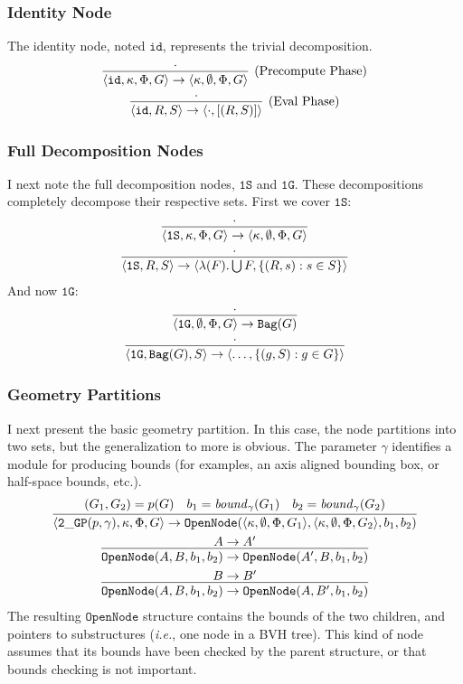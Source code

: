\documentclass{article}
\newcommand {\oneS}{\mathtt{1S}}
\newcommand {\oneG}{\mathtt{1G}}
\newcommand {\id}{\mathtt{id}}
\newcommand {\twoGP}{\mathtt{2\_GP}}
\newcommand {\bound}{\mathit{bound}}
\newcommand {\bag}{\mathtt{Bag}}
\newcommand {\twoBox}{\mathtt{OpenNode}}
\begin{document}
\subsubsection{Identity Node}
The identity node, noted $\id$, represents the trivial decomposition.
\begin{gather}
\infer[\text{(Precompute Phase)}] {\langle\id, \kappa, \Phi, G \rangle \to \langle \kappa, \emptyset, \Phi, G \rangle}{\cdot} \\
\infer[\text{(Eval Phase)}] {\langle\id, R, S \rangle \to \langle \cdot, [(R,S)] \rangle}{\cdot} 
\end{gather}

\subsubsection{Full Decomposition Nodes}
I next note the full decomposition nodes, $\oneS$ and $\oneG$.  These decompositions completely decompose their respective sets.  First we cover $\oneS$:
\begin{gather}
\infer{\langle\oneS, \kappa, \Phi, G \rangle \to \langle \kappa, \emptyset, \Phi, G \rangle}{\cdot}
\\
\infer{\langle\oneS, R, S\rangle \to \langle \lambda(F).\bigcup F, \{(R,s) : s \in S\} \rangle}{\cdot} 
\end{gather}
And now $\oneG$:
\begin{gather}
\infer{\langle\oneG, \emptyset, \Phi, G \rangle \to \bag(G)}{\cdot}
\\
\infer{\langle\oneG, \bag(G), S\rangle \to \langle \ldots, \{(g,S) : g \in G\} \rangle}{\cdot} 
\end{gather}

\subsubsection{Geometry Partitions}
I next present the basic geometry partition. In this case, the node partitions into two sets, but the generalization to more is obvious.  The parameter $\gamma$ identifies a module for producing bounds (for examples, an axis aligned bounding box, or half-space bounds, etc.).
\begin{gather}
\infer{\langle\twoGP(p, \gamma), \kappa, \Phi, G \rangle \to \twoBox(\langle \kappa, \emptyset, \Phi, G_1 \rangle,\langle \kappa, \emptyset, \Phi, G_2 \rangle,b_1,b_2)}
{(G_1,G_2) = p(G) & b_1 = \bound_\gamma(G_1) & b_2 = \bound_\gamma(G_2)}
\\
\infer{\twoBox(A,B,b_1,b_2) \to \twoBox(A',B,b_1,b_2)}{A \to A'}
\\
\infer{\twoBox(A,B,b_1,b_2) \to \twoBox(A,B',b_1,b_2)}{B \to B'}
\end{gather}
The resulting $\twoBox$ structure contains the bounds of the two children, and pointers to substructures ({\it i.e.}, one node in a BVH tree).  This kind of node assumes that its bounds have been checked by the parent structure, or that bounds checking is not important.  
\end{document}
